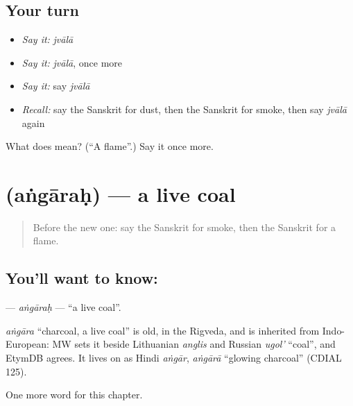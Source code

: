 \subsection*{Your turn}
\begin{itemize}
\raggedright
  \item \emph{Say it:} \emph{jvālā}
  \item \emph{Say it:} \emph{jvālā}, once more
  \item \emph{Say it:} say \emph{jvālā}
  \item \emph{Recall:} say the Sanskrit for dust, then the Sanskrit for smoke, then say \emph{jvālā} again
\end{itemize}

\begin{tcolorbox}[breakable,colback=teal!4,colframe=teal!35!black,title={Before you move on}]
What does  mean? (\textquotedblleft{}A flame\textquotedblright{}.) Say it once more.
\end{tcolorbox}
\section[\texorpdfstring{\sk{अंगारः} (aṅgāraḥ)}{अंगारः (aṅgāraḥ)}]{ (aṅgāraḥ) — a live coal}

\label{lesson:SA-C165-angarah}



\begin{quote}
Before the new one: say the Sanskrit for smoke, then the Sanskrit for a flame.
\end{quote}

\subsection*{You'll want to know: }
\textbf{} — \emph{aṅgāraḥ} — \textquotedblleft{}a live coal\textquotedblright{}.

\begin{cousinweb}
\emph{aṅgāra} \textquotedblleft{}charcoal, a live coal\textquotedblright{} is old, in the Rigveda, and is inherited from Indo-European: MW sets it beside Lithuanian \emph{anglis} and Russian \emph{ugol'} \textquotedblleft{}coal\textquotedblright{}, and EtymDB agrees. It lives on as Hindi \emph{aṅgār}, \emph{aṅgārā} \textquotedblleft{}glowing charcoal\textquotedblright{} (CDIAL 125).
\end{cousinweb}

\begin{grammarlens}[title={What you've built}]
One more word for this chapter.
\end{grammarlens}

